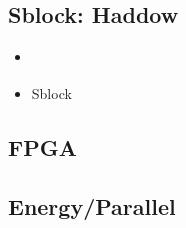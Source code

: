 \subsection{Sblock: Haddow}

\begin{itemize}
    \item \cite{haddow2000sblock}
    \item Sblock
\end{itemize}

\subsection{FPGA}

\TODO

\subsection{Energy/Parallel}

\TODO

